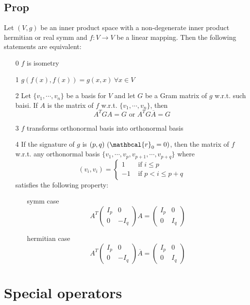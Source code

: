 \documentclass{book}
\begin{document}
\section{Prop}
Let $(V,g)$ be an inner product space with a non-degenerate inner product hermitian or real symm and $f:V\rightarrow V$ be a linear mapping. Then the following statements are equivalent:
\begin{itemize}
    \item [0] $f$ is isometry
    \item [1] $g(f(x),f(x))=g(x,x)\ \forall x\in V$
    \item [2] Let $\{v_1,\cdots,v_n\}$ be a basis for $V$ and let $G$ be a Gram matrix of $g$ w.r.t. such baisi. If $A$ is the matrix of $f$ w.r.t. $\{v_1,\cdots,v_n\}$, then $$A^TGA=G\text{ or } A^TG\overline A=G$$
    \item [3] $f$ transforms orthonormal basis into orthonormal basis
    \item [4] If the signature of $g$ is $(p,q)\ (\mathbcal{r}_0=0)$, then the matrix of $f$ w.r.t. any orthonormal basis $\{v_1,\cdots,v_p,v_{p+1},\cdots,v_{p+q}\}$ where$$(v_i,v_i)=\begin{cases}
    1&\text{ if }i\leq p\\-1&\text{ if }p<i\leq p+q
    \end{cases}$$
    satisfies the following property:\begin{itemize}
        \item [symm case]$$A^T\begin{pmatrix}
            I_p&0\\0&-I_q
        \end{pmatrix}A=\begin{pmatrix}
            I_p&0\\0&I_q\end{pmatrix}$$
        \item [hermitian case]$$A^T\begin{pmatrix}
            I_p&0\\0&-I_q
        \end{pmatrix}\overline A=\begin{pmatrix}
            I_p&0\\0&I_q\end{pmatrix}$$
    \end{itemize}
\end{itemize}
\chapter{Special operators}
\end{document}
